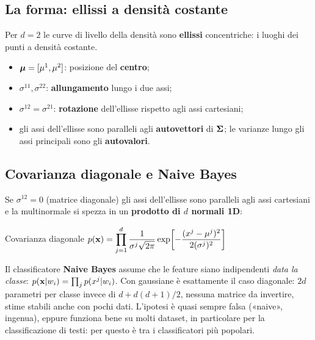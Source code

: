 \subsection{La forma: ellissi a densità costante}
Per $d=2$ le curve di livello della densità sono \textbf{ellissi} concentriche: i luoghi dei punti a densità costante.
\begin{tecnica}
\begin{itemize}
  \item $\bm{\mu}=[\mu^1,\mu^2]$: posizione del \textbf{centro};
  \item $\sigma^{11},\sigma^{22}$: \textbf{allungamento} lungo i due assi;
  \item $\sigma^{12}=\sigma^{21}$: \textbf{rotazione} dell'ellisse rispetto agli assi cartesiani;
  \item gli assi dell'ellisse sono paralleli agli \textbf{autovettori} di $\bm{\Sigma}$; le varianze lungo gli assi principali sono gli \textbf{autovalori}.
\end{itemize}
\end{tecnica}

\subsection{Covarianza diagonale e Naive Bayes}
Se $\sigma^{12}=0$ (matrice diagonale) gli assi dell'ellisse sono paralleli agli assi cartesiani e la multinormale si spezza in un \textbf{prodotto di $d$ normali 1D}:
\begin{formulat}{Covarianza diagonale}
$\displaystyle p(\mathbf{x})=\prod_{j=1}^{d}\frac{1}{\sigma^j\sqrt{2\pi}}\exp\!\left[-\frac{(x^j-\mu^j)^2}{2(\sigma^j)^2}\right]$
\end{formulat}
\begin{mlbox}
Il classificatore \textbf{Naive Bayes} assume che le feature siano indipendenti \emph{data la classe}: $p(\mathbf{x}|w_i)=\prod_j p(x^j|w_i)$. Con gaussiane è esattamente il caso diagonale: $2d$ parametri per classe invece di $d+d(d+1)/2$, nessuna matrice da invertire, stime stabili anche con pochi dati. L'ipotesi è quasi sempre falsa («naive», ingenua), eppure funziona bene su molti dataset, in particolare per la classificazione di testi: per questo è tra i classificatori più popolari.
\end{mlbox}


